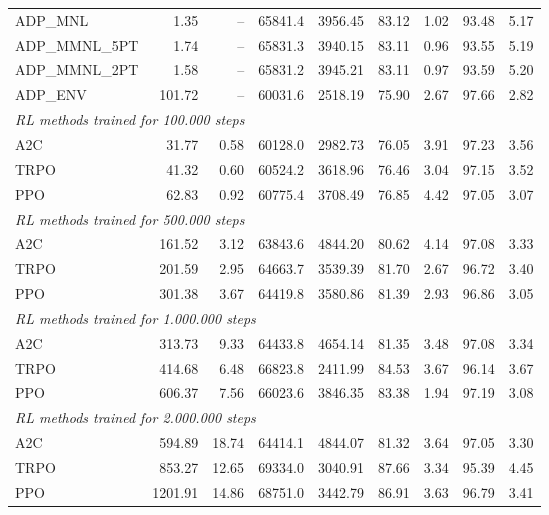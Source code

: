 \begin{samepage}
\begin{center}
\begin{tabular}{l|rr|rr|rr|rr}
    \midrule
    ADP\_MNL     &     1.35 &    -- &    65841.4 &    3956.45 &   83.12 &    1.02 &   93.48 &    5.17 \\
    ADP\_MMNL\_5PT &     1.74 &    -- &    65831.3 &    3940.15 &   83.11 &    0.96 &   93.55 &    5.19 \\
    ADP\_MMNL\_2PT &     1.58 &    -- &    65831.2 &    3945.21 &   83.11 &    0.97 &   93.59 &    5.20 \\
    ADP\_ENV     &   101.72 &    -- &    60031.6 &    2518.19 &   75.90 &    2.67 &   97.66 &    2.82 \\
    \midrule
    \multicolumn{9}{l}{\textit{RL methods trained for 100.000 steps}} \\
    \midrule
    A2C          &    31.77 &     0.58 &    60128.0 &    2982.73 &   76.05 &    3.91 &   97.23 &    3.56 \\
    TRPO         &    41.32 &     0.60 &    60524.2 &    3618.96 &   76.46 &    3.04 &   97.15 &    3.52 \\
    PPO          &    62.83 &     0.92 &    60775.4 &    3708.49 &   76.85 &    4.42 &   97.05 &    3.07 \\
    \midrule
    \multicolumn{9}{l}{\textit{RL methods trained for 500.000 steps}} \\
    \midrule
    A2C          &   161.52 &     3.12 &    63843.6 &    4844.20 &   80.62 &    4.14 &   97.08 &    3.33 \\
    TRPO         &   201.59 &     2.95 &    64663.7 &    3539.39 &   81.70 &    2.67 &   96.72 &    3.40 \\
    PPO          &   301.38 &     3.67 &    64419.8 &    3580.86 &   81.39 &    2.93 &   96.86 &    3.05 \\
    \midrule
    \multicolumn{9}{l}{\textit{RL methods trained for 1.000.000 steps}} \\
    \midrule
    A2C          &   313.73 &     9.33 &    64433.8 &    4654.14 &   81.35 &    3.48 &   97.08 &    3.34 \\
    TRPO         &   414.68 &     6.48 &    66823.8 &    2411.99 &   84.53 &    3.67 &   96.14 &    3.67 \\
    PPO          &   606.37 &     7.56 &    66023.6 &    3846.35 &   83.38 &    1.94 &   97.19 &    3.08 \\
    \midrule
    \multicolumn{9}{l}{\textit{RL methods trained for 2.000.000 steps}} \\
    \midrule
    A2C          &   594.89 &    18.74 &    64414.1 &    4844.07 &   81.32 &    3.64 &   97.05 &    3.30 \\
    TRPO         &   853.27 &    12.65 &    69334.0 &    3040.91 &   87.66 &    3.34 &   95.39 &    4.45 \\
    PPO          &  1201.91 &    14.86 &    68751.0 &    3442.79 &   86.91 &    3.63 &   96.79 &    3.41 \\
    \bottomrule
  \end{tabular}
\end{center}
\end{samepage}

